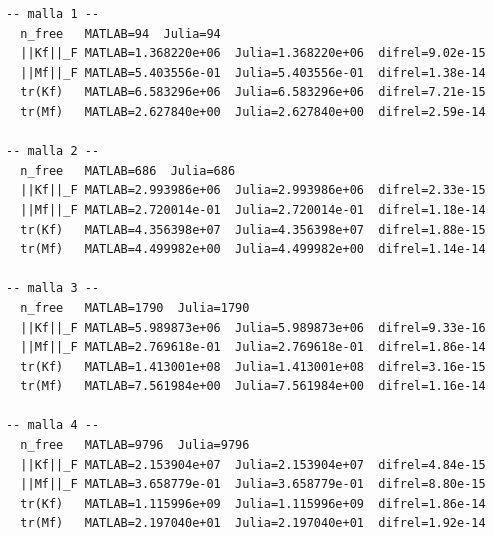 \documentclass[12pt]{report} %
\begin{document}
\begin{lstlisting}[numbers=none, captionpos=b, caption={Salida completa de la suite de tests.}, label=cod:salida-tests]
-- malla 1 --
  n_free   MATLAB=94  Julia=94
  ||Kf||_F MATLAB=1.368220e+06  Julia=1.368220e+06  difrel=9.02e-15
  ||Mf||_F MATLAB=5.403556e-01  Julia=5.403556e-01  difrel=1.38e-14
  tr(Kf)   MATLAB=6.583296e+06  Julia=6.583296e+06  difrel=7.21e-15
  tr(Mf)   MATLAB=2.627840e+00  Julia=2.627840e+00  difrel=2.59e-14

-- malla 2 --
  n_free   MATLAB=686  Julia=686
  ||Kf||_F MATLAB=2.993986e+06  Julia=2.993986e+06  difrel=2.33e-15
  ||Mf||_F MATLAB=2.720014e-01  Julia=2.720014e-01  difrel=1.18e-14
  tr(Kf)   MATLAB=4.356398e+07  Julia=4.356398e+07  difrel=1.88e-15
  tr(Mf)   MATLAB=4.499982e+00  Julia=4.499982e+00  difrel=1.14e-14

-- malla 3 --
  n_free   MATLAB=1790  Julia=1790
  ||Kf||_F MATLAB=5.989873e+06  Julia=5.989873e+06  difrel=9.33e-16
  ||Mf||_F MATLAB=2.769618e-01  Julia=2.769618e-01  difrel=1.86e-14
  tr(Kf)   MATLAB=1.413001e+08  Julia=1.413001e+08  difrel=3.16e-15
  tr(Mf)   MATLAB=7.561984e+00  Julia=7.561984e+00  difrel=1.16e-14

-- malla 4 --
  n_free   MATLAB=9796  Julia=9796
  ||Kf||_F MATLAB=2.153904e+07  Julia=2.153904e+07  difrel=4.84e-15
  ||Mf||_F MATLAB=3.658779e-01  Julia=3.658779e-01  difrel=8.80e-15
  tr(Kf)   MATLAB=1.115996e+09  Julia=1.115996e+09  difrel=1.86e-14
  tr(Mf)   MATLAB=2.197040e+01  Julia=2.197040e+01  difrel=1.92e-14


\end{lstlisting}
\end{document}
